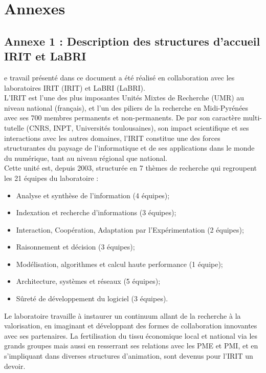 %
%

\chapter{Annexes}
\label{chap:annex}

\section{Annexe 1 : Description des structures d'accueil IRIT et LaBRI}
e travail présenté dans ce document a été réalisé en collaboration avec les laboratoires \acs{IRIT} (\acl{IRIT}) et \acs{LaBRI} (\acl{LaBRI}).\\
L'IRIT est l'une des plus imposantes Unités Mixtes de Recherche (UMR) au niveau national (français), et l’un des piliers de la recherche en Midi-Pyrénées avec ses 700 membres permanents et non-permanents. De par son caractère multi-tutelle (CNRS, \acs{INPT}, Universités toulousaines), son impact scientifique et ses interactions avec les autres domaines, l'IRIT constitue une des forces structurantes du paysage de l’informatique et de ses applications dans le monde du numérique, tant au niveau régional que national.\\
Cette unité est, depuis 2003, structurée en 7 thèmes de recherche qui regroupent les 21 équipes du laboratoire :
\begin{itemize}[label=]
    \item Analyse et synthèse de l’information (4 équipes);
    \item Indexation et recherche d’informations (3 équipes);
    \item Interaction, Coopération, Adaptation par l’Expérimentation (2 équipes);
    \item Raisonnement et décision (3 équipes);
    \item Modélisation, algorithmes et calcul haute performance (1 équipe);
    \item Architecture, systèmes et réseaux (5 équipes);
    \item Sûreté de développement du logiciel (3 équipes).
\end{itemize}

\noindent Le laboratoire travaille à instaurer un continuum allant de la recherche à la valorisation, en imaginant et développant des formes de collaboration innovantes avec ses partenaires. La fertilisation du tissu économique local et national via les grands groupes mais aussi en resserrant ses relations avec les PME et PMI, et en s'impliquant dans diverses structures d’animation, sont devenus pour l’IRIT un devoir.\\

